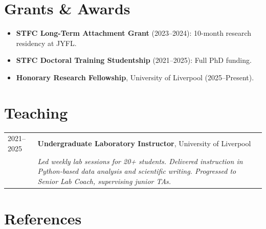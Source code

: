 \documentclass[a4paper,11pt]{article}
\begin{document}
\section{Grants \& Awards}
\begin{itemize}[nosep, leftmargin=1.5em]
    \item \textbf{STFC Long-Term Attachment Grant} (2023--2024): 10-month research residency at JYFL.
    \item \textbf{STFC Doctoral Training Studentship} (2021--2025): Full PhD funding.
    \item \textbf{Honorary Research Fellowship}, University of Liverpool (2025--Present).
\end{itemize}

\section{Teaching}
\begin{tabularx}{\linewidth}{@{}l X@{}}
2021--2025 & \textbf{Undergraduate Laboratory Instructor}, University of Liverpool \\
& \emph{Led weekly lab sessions for 20+ students. Delivered instruction in Python-based data analysis and scientific writing. Progressed to Senior Lab Coach, supervising junior TAs.}
\end{tabularx}

\section{References}
\end{document}
